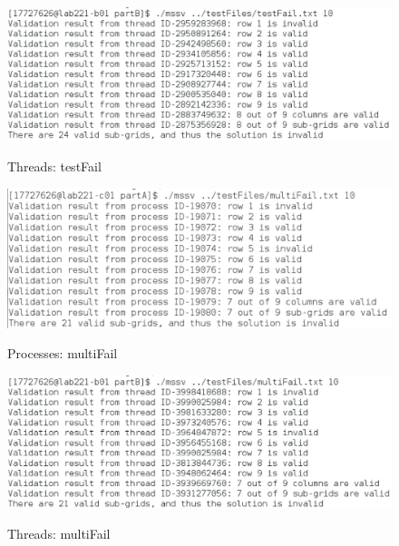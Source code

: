 \documentclass[]{article}
\begin{document}
	\begin{figure}[H]
	\caption{Threads: testFail}		
	\begin{center}
		{
			\includegraphics[height=0.25\textheight,width=1.0
			\textwidth]{Thr_testF.png}}
	\end{center}
	\end{figure}

	\begin{figure}[H]
	\caption{Processes: multiFail}
	\begin{center}
		{
			\includegraphics[height=0.25\textheight,width=1.0
			\textwidth]{Pro_multiF.png}}
	\end{center}
	\end{figure}


	\begin{figure}[H]
	\caption{Threads: multiFail}		
	\begin{center}
		{
			\includegraphics[height=0.25\textheight,width=1.0
			\textwidth]{Thr_multiF.png}}
	\end{center}
	\end{figure}

\pagebreak
\end{document}
